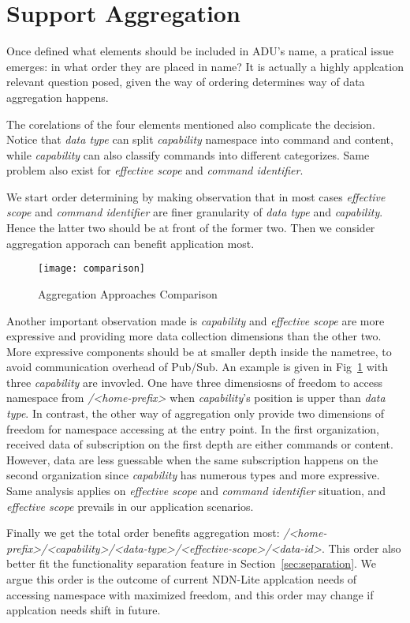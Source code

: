 \section{Support Aggregation}
\label{sec:data-aggregation}

Once defined what elements should be included in ADU's name, a pratical issue emerges: in what order they are placed in name?
It is actually a highly applcation relevant question posed, given the way of ordering determines way of data aggregation happens.

The corelations of the four elements mentioned also complicate the decision. 
Notice that \textit{data type} can split \textit{capability} namespace into command and content, while \textit{capability} can also classify commands into different categorizes.
Same problem also exist for \textit{effective scope} and \textit{command identifier}.

We start order determining by making observation that in most cases \textit{effective scope} and \textit{command identifier} are finer granularity of \textit{data type} and \textit{capability}.
Hence the latter two should be at front of the former two.
Then we consider aggregation apporach can benefit application most. 

\begin{figure}[!h]
    \centering
    \texttt{[image: comparison]}
    \caption{Aggregation Approaches Comparison}
    \label{fig:aggregation-comparison}
\end{figure}

Another important observation made is \textit{capability} and \textit{effective scope} are more expressive and providing more data collection dimensions than the other two.
More expressive components should be at smaller depth inside the nametree, to avoid communication overhead of Pub/Sub.
An example is given in Fig~\ref{fig:aggregation-comparison} with three \textit{capability} are invovled. 
One have three dimensiosns of freedom to access namespace from \textsl{/<home-prefix>} when \textit{capability}'s position is upper than \textit{data type}.
In contrast, the other way of aggregation only provide two dimensions of freedom for namespace accessing at the entry point.
In the first organization, received data of subscription on the first depth are either commands or content.
However, data are less guessable when the same subscription happens on the second organization since \textit{capability} has numerous types and more expressive.
Same analysis applies on \textit{effective scope} and \textit{command identifier} situation, and \textit{effective scope} prevails in our application scenarios.

Finally we get the total order benefits aggregation most: \textsl{/<home-prefix>/<capability>/<data-type>/<effective-scope>/<data-id>}.
This order also better fit the functionality separation feature in Section~\ref{sec:separation}.
We argue this order is the outcome of current NDN-Lite applcation needs of accessing namespace with maximized freedom, and this order may change if applcation needs shift in future.